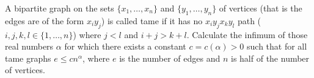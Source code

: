 A bipartite graph on the sets $\{ x_1,\ldots, x_n \}$ and $\{ y_1,\ldots, y_n\}$ of vertices (that is the edges are of the form $x_iy_j$) is called tame if it has no $x_iy_jx_ky_l$ path ($i,j,k,l\in\{ 1,\ldots, n\}$) where $j<l$ and $i+j>k+l$. Calculate the infimum of those real numbers $\alpha$ for which there exists a constant $c=c(\alpha)>0$ such that for all tame graphs $e\le cn^{\alpha}$, where $e$ is the number of edges and $n$ is half of the number of vertices.
